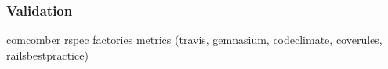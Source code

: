 \subsubsection{Validation}
comcomber
rspec
factories
metrics (travis, gemnasium, codeclimate, coverules, railsbestpractice)